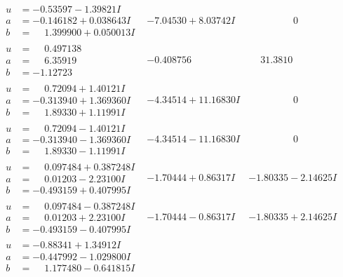 \documentclass[1p]{elsarticle_modified}
\theoremstyle{definition}
\begin{document}
$$\begin{array}{c|c|c}
\begin{aligned}
u &= -0.53597 - 1.39821 I \\
a &= -0.146182 + 0.038643 I \\
b &= \phantom{-}1.399900 + 0.050013 I\end{aligned}
 & -7.04530 + 8.03742 I & \phantom{-0.000000 } 0 \\ \hline\begin{aligned}
u &= \phantom{-}0.497138\phantom{ +0.000000I} \\
a &= \phantom{-}6.35919\phantom{ +0.000000I} \\
b &= -1.12723\phantom{ +0.000000I}\end{aligned}
 & -0.408756\phantom{ +0.000000I} & \phantom{-}31.3810\phantom{ +0.000000I} \\ \hline\begin{aligned}
u &= \phantom{-}0.72094 + 1.40121 I \\
a &= -0.313940 + 1.369360 I \\
b &= \phantom{-}1.89330 + 1.11991 I\end{aligned}
 & -4.34514 + 11.16830 I & \phantom{-0.000000 } 0 \\ \hline\begin{aligned}
u &= \phantom{-}0.72094 - 1.40121 I \\
a &= -0.313940 - 1.369360 I \\
b &= \phantom{-}1.89330 - 1.11991 I\end{aligned}
 & -4.34514 - 11.16830 I & \phantom{-0.000000 } 0 \\ \hline\begin{aligned}
u &= \phantom{-}0.097484 + 0.387248 I \\
a &= \phantom{-}0.01203 - 2.23100 I \\
b &= -0.493159 + 0.407995 I\end{aligned}
 & -1.70444 + 0.86317 I & -1.80335 - 2.14625 I \\ \hline\begin{aligned}
u &= \phantom{-}0.097484 - 0.387248 I \\
a &= \phantom{-}0.01203 + 2.23100 I \\
b &= -0.493159 - 0.407995 I\end{aligned}
 & -1.70444 - 0.86317 I & -1.80335 + 2.14625 I \\ \hline\begin{aligned}
u &= -0.88341 + 1.34912 I \\
a &= -0.447992 - 1.029800 I \\
b &= \phantom{-}1.177480 - 0.641815 I\end{aligned}

\end{array}$$
\end{document}
